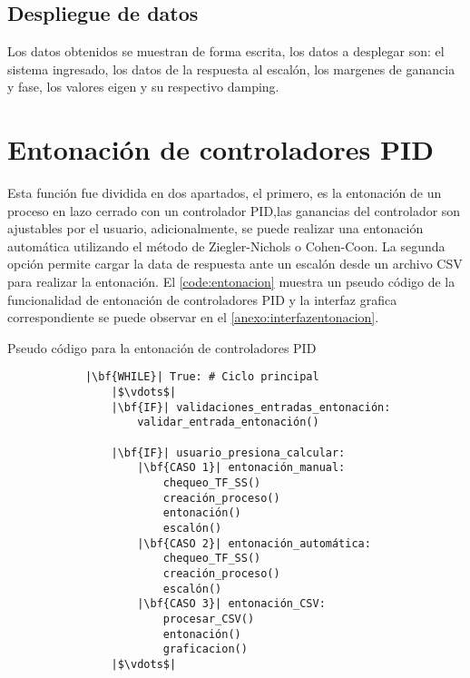     \subsection{Despliegue de datos}
        
        Los datos obtenidos se muestran de forma escrita, los datos a desplegar son: el sistema ingresado, los datos de la respuesta al escalón, los margenes de ganancia y fase, los valores eigen y su respectivo damping.

\section{Entonación de controladores PID}

    Esta función fue dividida en dos apartados, el primero, es la entonación de un proceso en lazo cerrado con un controlador PID,las ganancias del controlador son ajustables por el usuario, adicionalmente, se puede realizar una entonación automática utilizando el método de Ziegler-Nichols o Cohen-Coon. La segunda opción permite cargar la data de respuesta ante un escalón desde un archivo CSV para realizar la entonación. El \cref{code:entonacion} muestra un pseudo código de la funcionalidad de entonación de controladores PID y la interfaz grafica correspondiente se puede observar en el \ref{anexo:interfazentonacion}.
    
    \begin{longlisting}
        \caption[Pseudo código - Entonación de controladores PID]{Pseudo código para la entonación de controladores PID}
        \label{code:entonacion}				
        \begin{verbatim}
            |\bf{WHILE}| True: # Ciclo principal
                |$\vdots$|
                |\bf{IF}| validaciones_entradas_entonación:
                    validar_entrada_entonación()
                
                |\bf{IF}| usuario_presiona_calcular:
                    |\bf{CASO 1}| entonación_manual:
                        chequeo_TF_SS()
                        creación_proceso()
                        entonación()
                        escalón()
                    |\bf{CASO 2}| entonación_automática:
                        chequeo_TF_SS()
                        creación_proceso()
                        escalón()
                    |\bf{CASO 3}| entonación_CSV:
                        procesar_CSV()
                        entonación()
                        graficacion()
                |$\vdots$|
        \end{verbatim}
    \end{longlisting}

